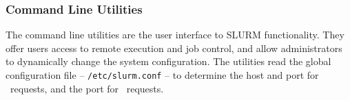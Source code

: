 \begin{itemize}

\end{itemize}

\subsubsection{Command Line Utilities}

The command line utilities are the user interface to SLURM functionality.
They offer users access to remote execution and job control, and allow
administrators to dynamically change the system configuration. The 
utilities read the global configuration file -- {\tt /etc/slurm.conf} --
to determine the host and port for \slurmctld\ requests, and the port
for \slurmd\ requests. 

